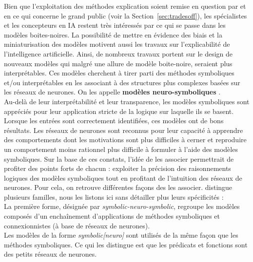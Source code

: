 \documentclass{report}
\newcommand{\alh}[1]{\textcolor{teal}{#1}}
\begin{document}
    Bien que l'exploitation des méthodes explication soient remise en question par \cite{bell_its_2022} et \cite{kastner_relation_2021} en ce qui concerne le grand public (voir la Section~\ref{sec:tradesoff}), les spécialistes et les concepteurs en IA restent très intéressés par ce qui se passe dans les modèles boites-noires. La possibilité de mettre en évidence des biais et la miniaturisation des modèles motivent aussi les travaux sur l'explicabilité de l'intelligence artificielle.
    Ainsi, de nombreux travaux portent sur le design de nouveaux modèles qui malgré une allure de modèle boite-noire, seraient plus interprétables. Ces modèles cherchent à tirer parti des méthodes symboliques et/ou interprétables en les associant à des structures plus complexes basées sur les réseaux de neurones. On les appelle \textbf{modèles neuro-symboliques} \cite{bhuyan_neuro-symbolic_2024}. \\
    Au-delà de leur interprétabilité et leur transparence, les modèles symboliques sont appréciés pour leur application stricte de la logique sur laquelle ils se basent. Lorsque les entrées sont correctement identifiées, ces modèles ont de bons résultats. Les réseaux de neurones sont reconnus pour leur capacité à apprendre des comportements dont les motivations sont plus difficiles à cerner et reproduire un comportement moins rationnel plus difficile à formuler à l'aide des modèles symboliques. Sur la base de ces constats, l'idée de les associer permettrait de profiter des points forts de chacun : exploiter la précision des raisonnements logiques des modèles symboliques tout en profitant de l'intuition des réseaux de neurones. Pour cela, on retrouve différentes façons des les associer. \cite{bhuyan_neuro-symbolic_2024} distingue plusieurs familles, nous les listons ici sans détailler plus leurs spécificités
    :\\
    La première forme, désignée par \emph{symbolic-neuro-symbolic}, regroupe les modèles composés d'un enchaînement d'applications de méthodes symboliques et connexionnistes (à base de réseaux de neurones). \\
    Les modèles de la forme \emph{symbolic[neuro]} sont utilisés de la même façon que les méthodes symboliques. Ce qui les distingue est que les prédicats et fonctions sont des petits réseaux de neurones.\\
\end{document}
